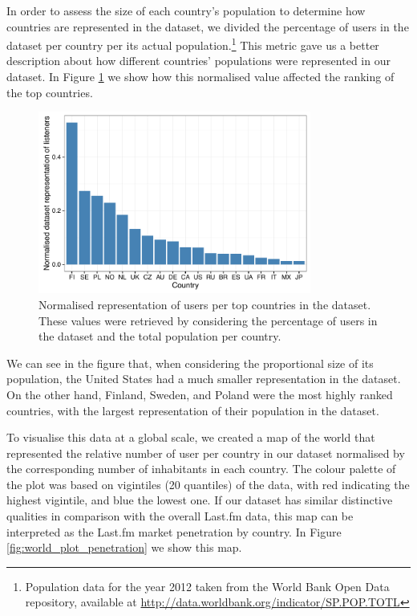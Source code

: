 In order to assess the size of each country's population to determine how countries are represented in the dataset, we divided the percentage of users in the dataset per country per its actual population.\footnote{Population data for the year 2012 taken from the World Bank Open Data repository, available at \url{http://data.worldbank.org/indicator/SP.POP.TOTL}} 
This metric gave us a better description about how different countries' populations were represented in our dataset.
In Figure \ref{fig:normalised_percentage_by_country_population} we show how this normalised value affected the ranking of the top countries. 


\begin{figure}[!h]
	\vspace{1em}
	\centering
	\includegraphics[width = 0.8\textwidth]{normalised_percentage_by_country_population.pdf}
	\caption[Normalised representation of users per top countries in the dataset]{Normalised representation of users per top countries in the dataset. These values were retrieved by considering the percentage of users in the dataset and the total population per country.}
	\label{fig:normalised_percentage_by_country_population}
\end{figure}


We can see in the figure that, when considering the proportional size of its population, the United States had a much smaller representation in the dataset. On the other hand, Finland, Sweden, and Poland were the most highly ranked countries, with the largest representation of their population in the dataset.

To visualise this data at a global scale, we created a map of the world that represented the relative number of user per country in our dataset normalised by the corresponding number of inhabitants in each country. The colour palette of the plot was based on vigintiles (20 quantiles) of the data, with red indicating the highest vigintile, and blue the lowest one. 
If our dataset has similar distinctive qualities in comparison with the overall Last.fm data, this map can be interpreted as the Last.fm market penetration by country. In Figure \ref{fig:world_plot_penetration} we show this map.


